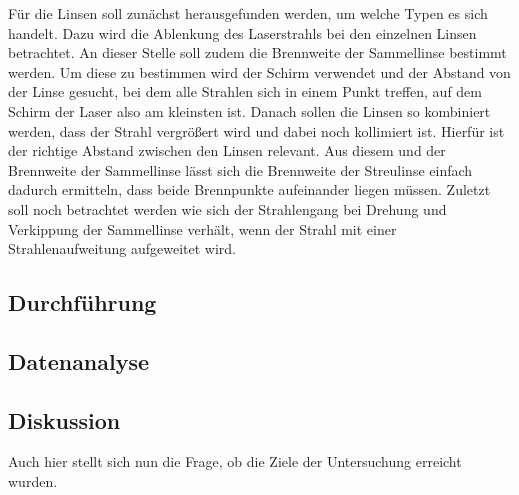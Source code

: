 			Für die Linsen soll zunächst herausgefunden werden, um welche Typen es sich handelt.
			Dazu wird die Ablenkung des Laserstrahls bei den einzelnen Linsen betrachtet.
			An dieser Stelle soll zudem die Brennweite der Sammellinse bestimmt werden.
			Um diese zu bestimmen wird der Schirm verwendet und der Abstand von der Linse gesucht, bei dem alle Strahlen sich in einem Punkt treffen, auf dem Schirm der Laser also am kleinsten ist. 
			Danach sollen die Linsen so kombiniert werden, dass der Strahl vergrößert wird und dabei noch kollimiert ist.
			Hierfür ist der richtige Abstand zwischen den Linsen relevant.
			Aus diesem und der Brennweite der Sammellinse lässt sich die Brennweite der Streulinse einfach dadurch ermitteln, dass beide Brennpunkte aufeinander liegen müssen.  
			Zuletzt soll noch betrachtet werden wie sich der Strahlengang bei Drehung und Verkippung der Sammellinse verhält, wenn der Strahl mit einer Strahlenaufweitung aufgeweitet wird.
			
	\subsection{Durchführung}
		
		 
	\subsection{Datenanalyse}
		
		
	\subsection{Diskussion}
		
		Auch hier stellt sich nun die Frage, ob die Ziele der Untersuchung erreicht wurden.
		
